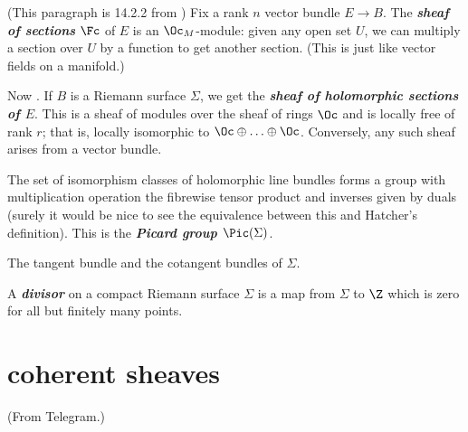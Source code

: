 \begin{remark}
	(This paragraph is 14.2.2 from \cite{the-rising-sea}) Fix a rank $n$ vector bundle $E\to B$. The \textbf{\textit{sheaf of sections}} $\Fc$ of $E$ is an $\Oc_M$-module: given any open set $U$, we can multiply a section over $U$ by a function to get another section. {\color{cyan}(This is just like vector fields on a manifold.)}
	
	Now \cite{donaldson}. If $B$ is a Riemann surface $\Sigma$, we get the \textbf{\textit{sheaf of holomorphic sections of $E$}}. This is a sheaf of modules over the sheaf of rings $\Oc$ and is locally free of rank $r$; that is, locally isomorphic to $\Oc\oplus\ldots\oplus\Oc$. Conversely, any such sheaf arises from a vector bundle.
\end{remark}
\begin{defn}
	The set of isomorphism classes of holomorphic line bundles forms a group with multiplication operation the fibrewise tensor product and {\color{magenta}inverses given by duals (surely it would be nice to see the equivalence between this and Hatcher's definition)}. This is the \textbf{\textit{Picard group $\Pic(\Sigma)$}}.
\end{defn}
\begin{example}
	The tangent bundle and the cotangent bundles of $\Sigma$.
\end{example}
\begin{defn}
	A \textbf{\textit{divisor}} on a compact Riemann surface $\Sigma$ is a map from $\Sigma$ to $\Z$ which is zero for all but finitely many points.
\end{defn}
	
\section{coherent sheaves}

(From Telegram.)


